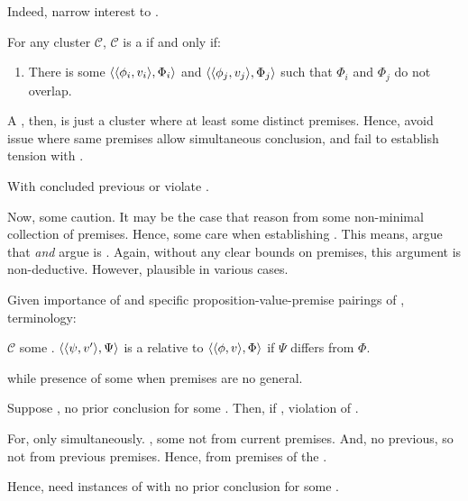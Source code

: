 \begin{note}
  Indeed, narrow interest to .

  \begin{definition}[\ragCluster{3}]
    For any cluster \(\mathcal{C}\), \(\mathcal{C}\) is a \emph{\ragCluster{}} if and only if:
    \begin{enumerate}
    \item
      There is some \(\langle \langle \phi_{i}, v_{i} \rangle, \Phi_{i} \rangle\) and \(\langle \langle \phi_{j}, v_{j} \rangle, \Phi_{j} \rangle\) such that \(\Phi_{i}\) and \(\Phi_{j}\) do not overlap.
    \end{enumerate}
    \vspace{-\baselineskip}
  \end{definition}

  A \ragCluster{}, then, is just a cluster where at least some distinct premises.
  Hence, avoid issue where same premises allow simultaneous conclusion, and fail to establish tension with \ESU{}.

  \begin{proposition}
    With \ragCluster{} concluded previous or violate \ESU{}.
  \end{proposition}

  Now, some caution.
  It may be the case that reason from some non-minimal collection of premises.
  Hence, some care when establishing \ragged{}.
  This means, argue that \cluster{} \emph{and} argue \cluster{} is \ragged{}.
  Again, without any clear bounds on premises, this argument is non-deductive.
  However, plausible in various cases.
\end{note}

\begin{note}
  Given importance of \ragged{} and specific proposition-value-premise pairings of \ragged{}, terminology:

  \begin{definition}
    \(\mathcal{C}\) some \ragCluster{}.
    \(\langle \langle \psi, v' \rangle, \Psi \rangle\) is a \emph{} relative to \(\langle \langle \phi, v \rangle, \Phi \rangle\) if \(\Psi\) differs from \(\Phi\).
  \end{definition}

  \csN{} while presence of some \jag{} when premises are no general.
\end{note}

\begin{note}
  Suppose \ragged{}, no prior conclusion for some \jag{}.
  Then, if \csN{}, violation of \ESU{}.

  For, only \csN{} simultaneously.
  \jag{}, some not from current premises.
  And, no previous, so not from previous premises.
  Hence, \csN{} from premises of the \jag{}.

  Hence, need instances of \ragged{} with no prior conclusion for some \jag{}.
\end{note}

